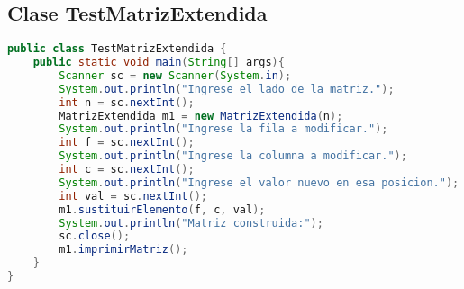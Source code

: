 \documentclass{article}
\begin{document}
\subsection{Clase TestMatrizExtendida}

\begin{lstlisting}[language=Java]
public class TestMatrizExtendida {
    public static void main(String[] args){
        Scanner sc = new Scanner(System.in);
        System.out.println("Ingrese el lado de la matriz.");
        int n = sc.nextInt();
        MatrizExtendida m1 = new MatrizExtendida(n);
        System.out.println("Ingrese la fila a modificar.");
        int f = sc.nextInt();
        System.out.println("Ingrese la columna a modificar.");
        int c = sc.nextInt();
        System.out.println("Ingrese el valor nuevo en esa posicion.");
        int val = sc.nextInt();
        m1.sustituirElemento(f, c, val);
        System.out.println("Matriz construida:");
        sc.close();
        m1.imprimirMatriz();
    }
}
\end{lstlisting}
\end{document}
